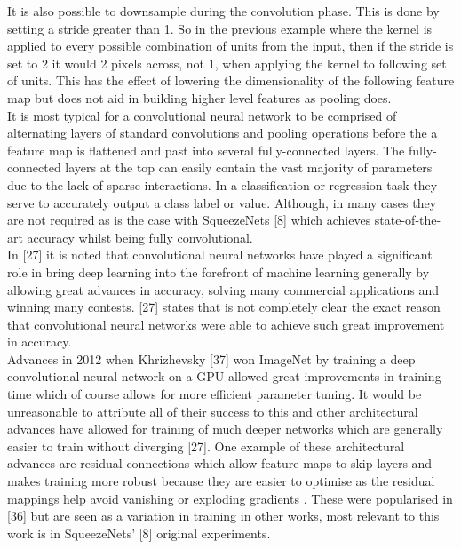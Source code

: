 \documentclass{article}
\begin{document}
It is also possible to downsample during the convolution phase. This is done by setting a stride greater than 1. So in the previous example where the kernel is applied to every possible combination of units from the input, then if the stride is set to 2 it would 2 pixels across, not 1, when applying the kernel to following set of units. This has the effect of lowering the dimensionality of the following feature map but does not aid in building higher level features as pooling does.\\

It is most typical for a convolutional neural network to be comprised of alternating layers of standard convolutions and pooling operations before the a feature map is flattened and past into several fully-connected layers. The fully-connected layers at the top can easily contain the vast majority of parameters due to the lack of sparse interactions. In a classification or regression task they serve to accurately output a class label or value. Although, in many cases they are not required as is the case with SqueezeNets [8] which achieves state-of-the-art accuracy whilst being fully convolutional. \\

In [27] it is noted that convolutional neural networks have played a significant role in bring deep learning into the forefront of machine learning generally by allowing great advances in accuracy, solving many commercial applications and winning many contests. [27] states that is not completely clear the exact reason that convolutional neural networks were able to achieve such great improvement in accuracy.\\ 

Advances in 2012 when Khrizhevsky [37] won ImageNet by training a deep convolutional neural network on a GPU allowed great improvements in training time which of course allows for more efficient parameter tuning. It would be unreasonable to attribute all of their success to this and other architectural advances have allowed for training of much deeper networks which are generally easier to train without diverging [27]. One example of these architectural advances are residual connections which allow feature maps to skip layers and makes training more robust because they are easier to optimise as the residual mappings help avoid vanishing or exploding gradients . These were popularised in [36] but are seen as a variation in training in other works, most relevant to this work is in SqueezeNets' [8] original experiments.
\end{document}
